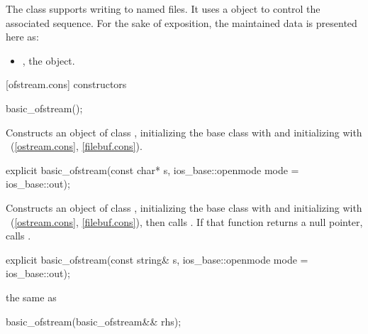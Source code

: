 \pnum
The class
supports writing to named files.
It uses a
object to control the associated
sequence.
For the sake of exposition, the maintained data is presented here as:
\begin{itemize}
\item
{}, the  object.
\end{itemize}

[ofstream.cons]{ constructors}

%
\begin{itemdecl}
basic_ofstream();
\end{itemdecl}

\begin{itemdescr}
\pnum
\effects
Constructs an object of class
,
initializing the base class with
and initializing  with
~(\ref{ostream.cons},
\ref{filebuf.cons}).
\end{itemdescr}

%
\begin{itemdecl}
explicit basic_ofstream(const char* s,
    ios_base::openmode mode = ios_base::out);
\end{itemdecl}

\begin{itemdescr}
\pnum
\effects
Constructs an object of class
,
initializing the base class with
and initializing  with
~(\ref{ostream.cons},
\ref{filebuf.cons}),
then calls
.
If that function returns a null pointer, calls
.
\end{itemdescr}

%
\begin{itemdecl}
explicit basic_ofstream(const string& s,
    ios_base::openmode mode = ios_base::out);
\end{itemdecl}

\begin{itemdescr}
\pnum
\effects the same as 
\end{itemdescr}

%
\begin{itemdecl}
basic_ofstream(basic_ofstream&& rhs);
\end{itemdecl}

